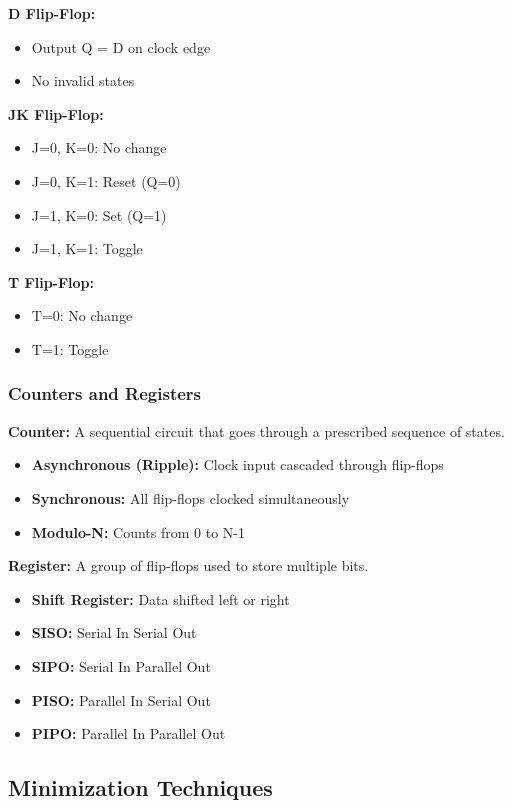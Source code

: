 \documentclass[11pt,a4paper]{article}
\begin{document}
\textbf{D Flip-Flop:}
\begin{itemize}
    \item Output Q = D on clock edge
    \item No invalid states
\end{itemize}

\textbf{JK Flip-Flop:}
\begin{itemize}
    \item J=0, K=0: No change
    \item J=0, K=1: Reset (Q=0)
    \item J=1, K=0: Set (Q=1)
    \item J=1, K=1: Toggle
\end{itemize}

\textbf{T Flip-Flop:}
\begin{itemize}
    \item T=0: No change
    \item T=1: Toggle
\end{itemize}

\subsubsection{Counters and Registers}

\textbf{Counter:} A sequential circuit that goes through a prescribed sequence of states.
\begin{itemize}
    \item \textbf{Asynchronous (Ripple):} Clock input cascaded through flip-flops
    \item \textbf{Synchronous:} All flip-flops clocked simultaneously
    \item \textbf{Modulo-N:} Counts from 0 to N-1
\end{itemize}

\textbf{Register:} A group of flip-flops used to store multiple bits.
\begin{itemize}
    \item \textbf{Shift Register:} Data shifted left or right
    \item \textbf{SISO:} Serial In Serial Out
    \item \textbf{SIPO:} Serial In Parallel Out
    \item \textbf{PISO:} Parallel In Serial Out
    \item \textbf{PIPO:} Parallel In Parallel Out
\end{itemize}

\subsection{Minimization Techniques}
\end{document}

